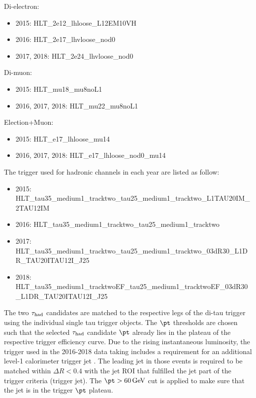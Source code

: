 Di-electron:

\begin{itemize}
\item 2015: HLT\_2e12\_lhloose\_L12EM10VH
\item 2016: HLT\_2e17\_lhvloose\_nod0
\item 2017, 2018: HLT\_2e24\_lhvloose\_nod0
\end{itemize}

Di-muon:

\begin{itemize}
\item 2015: HLT\_mu18\_mu8noL1
\item 2016, 2017, 2018: HLT\_mu22\_mu8noL1
\end{itemize}

Election+Muon:

\begin{itemize}
\item 2015: HLT\_e17\_lhloose\_mu14
\item 2016, 2017, 2018: HLT\_e17\_lhloose\_nod0\_mu14
\end{itemize}

The trigger used for hadronic channels in each year are listed as follow:
\begin{itemize}
\small
\item 2015: HLT\_tau35\_medium1\_tracktwo\_tau25\_medium1\_tracktwo\_L1TAU20IM\_2TAU12IM
\item 2016: HLT\_tau35\_medium1\_tracktwo\_tau25\_medium1\_tracktwo
\item 2017: HLT\_tau35\_medium1\_tracktwo\_tau25\_medium1\_tracktwo\_03dR30\_L1DR\_TAU20ITAU12I\_J25
\item 2018: HLT\_tau35\_medium1\_tracktwoEF\_tau25\_medium1\_tracktwoEF\_03dR30\_L1DR\_TAU20ITAU12I\_J25

 \end{itemize}

The two $\tau_\text{had}$ candidates are matched to the respective legs of the di-tau trigger using the individual single tau trigger objects. The $\pt$ thresholds are chosen such that the selected $\tau_\text{had}$ candidate $\pt$ already lies in the plateau of the respective trigger efficiency curve. Due to the rising instantaneous luminosity, the trigger used in the 2016-2018 data taking includes a requirement for an additional level-1 calorimeter trigger jet 
. The leading jet in those events is required to be matched within $\Delta R < 0.4$ with the jet ROI that fulfilled the jet part of the trigger criteria (trigger jet). The $\pt > \SI{60}{\GeV}$ cut is applied to make sure that the jet is in the trigger $\pt$ plateau.

